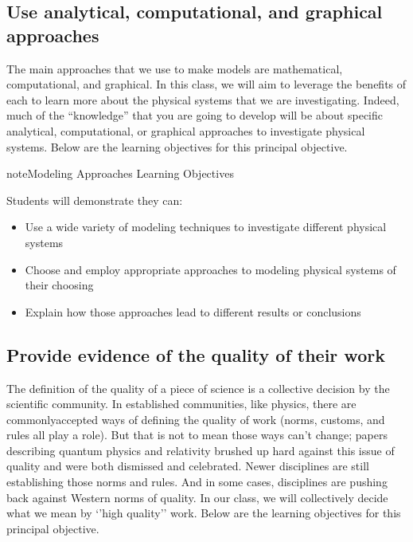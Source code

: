 \documentclass[letterpaper,10pt,english]{jupyterBook}
\begin{document}
\subsection{Use analytical, computational, and graphical approaches}
\label{\detokenize{content/0_course/1_goals:use-analytical-computational-and-graphical-approaches}}
\sphinxAtStartPar
The main approaches that we use to make models are mathematical, computational, and graphical. In this class, we will aim to leverage the benefits of each to learn more about the physical systems that we are investigating. Indeed, much of the “knowledge” that you are going to develop will be about specific analytical, computational, or graphical approaches to investigate physical systems. Below are the learning objectives for this principal objective.

\begin{sphinxadmonition}{note}{Modeling Approaches Learning Objectives}

\sphinxAtStartPar
Students will demonstrate they can:
\begin{itemize}
\item {} 
\sphinxAtStartPar
Use a wide variety of modeling techniques to investigate different physical systems

\item {} 
\sphinxAtStartPar
Choose and employ appropriate approaches to modeling physical systems of their choosing

\item {} 
\sphinxAtStartPar
Explain how those approaches lead to different results or conclusions

\end{itemize}
\end{sphinxadmonition}


\subsection{Provide evidence of the quality of their work}
\label{\detokenize{content/0_course/1_goals:provide-evidence-of-the-quality-of-their-work}}
\sphinxAtStartPar
The definition of the quality of a piece of science is a collective decision by the scientific community. In established communities, like physics, there are commonly\sphinxhyphen{}accepted ways of defining the quality of work (norms, customs, and rules all play a role). But that is not to mean those ways can’t change; papers describing quantum physics and relativity brushed up hard against this issue of quality and were both dismissed and celebrated. Newer disciplines are still establishing those norms and rules. And in some cases, disciplines are pushing back against Western norms of quality. In our class, we will collectively decide what we mean by ‘’high quality’’ work. Below are the learning objectives for this principal objective.
\end{document}

